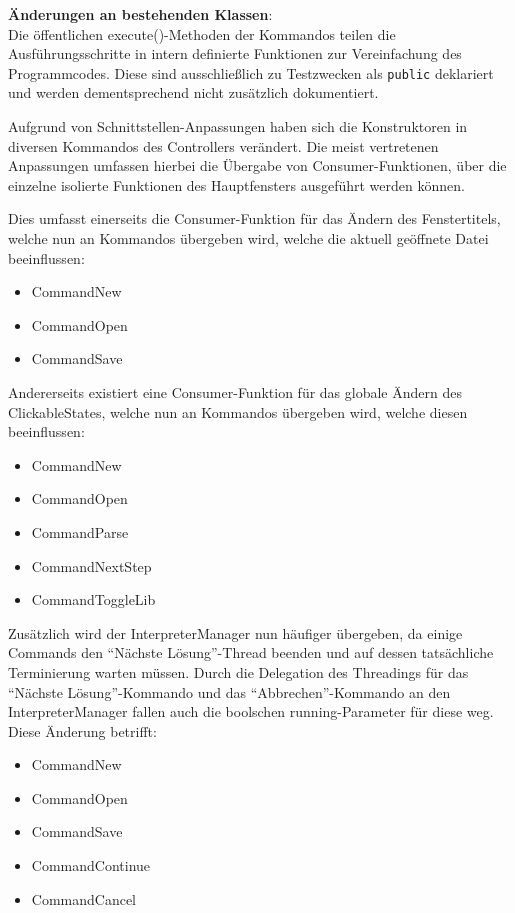 \documentclass[parskip=full,11pt,twoside]{scrartcl}
\begin{document}
\textbf{Änderungen an bestehenden Klassen}:\\
Die öffentlichen execute()-Methoden der Kommandos teilen die Ausführungsschritte in intern definierte Funktionen zur Vereinfachung des Programmcodes. Diese sind ausschließlich zu Testzwecken als \texttt{public} deklariert und werden dementsprechend nicht zusätzlich dokumentiert.

Aufgrund von Schnittstellen-Anpassungen haben sich die Konstruktoren in diversen Kommandos des Controllers verändert. Die meist vertretenen Anpassungen umfassen hierbei die Übergabe von Consumer-Funktionen, über die einzelne isolierte Funktionen des Hauptfensters ausgeführt werden können.

Dies umfasst einerseits die Consumer-Funktion für das Ändern des Fenstertitels, welche nun an Kommandos übergeben wird, welche die aktuell geöffnete Datei beeinflussen:
\begin{multicols}{3}
	\begin{itemize}
		\item CommandNew
		\item CommandOpen
		\item CommandSave
	\end{itemize}
\end{multicols}
\vspace*{-0.5cm}
Andererseits existiert eine Consumer-Funktion für das globale Ändern des ClickableStates, welche nun an Kommandos übergeben wird, welche diesen beeinflussen:
\begin{multicols}{3}
	\begin{itemize}
		\item CommandNew
		\item CommandOpen
		\item CommandParse
		\item CommandNextStep
		\item CommandToggleLib
	\end{itemize}
\end{multicols}
\vspace*{-0.5cm}
Zusätzlich wird der InterpreterManager nun häufiger übergeben, da einige Commands den \enquote{Nächste Lösung}-Thread beenden und auf dessen tatsächliche Terminierung warten müssen. Durch die Delegation des Threadings für das \enquote{Nächste Lösung}-Kommando und das \enquote{Abbrechen}-Kommando an den InterpreterManager fallen auch die boolschen running-Parameter für diese weg. Diese Änderung betrifft:
\begin{multicols}{3}
	\begin{itemize}
		\item CommandNew
		\item CommandOpen
		\item CommandSave
		\item CommandContinue
		\item CommandCancel
	\end{itemize}
\end{multicols}
\end{document}
